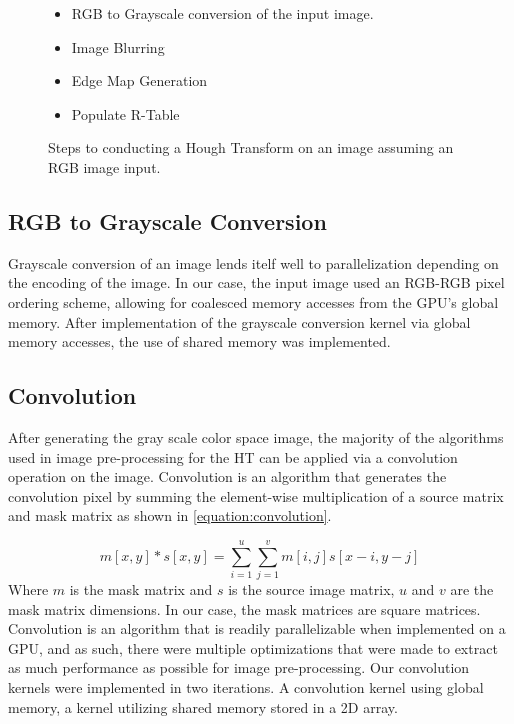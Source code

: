 \documentclass[conference]{IEEEtran}
\begin{document}
\begin{figure}[h]
  \begin{itemize}
    \item RGB to Grayscale conversion of the input image.
    \item Image Blurring 
    \item Edge Map Generation
    \item Populate R-Table
  \end{itemize}\caption{Steps to conducting a Hough Transform on an image assuming an RGB image input.}\label{figure:hough-transform-steps}
\end{figure}



\subsection{RGB to Grayscale Conversion}
Grayscale conversion of an image lends itelf well to parallelization depending on the encoding of the image.
In our case, the input image used an RGB-RGB pixel ordering scheme, allowing for coalesced memory accesses from the GPU's global memory.
After implementation of the grayscale conversion kernel via global memory accesses, the use of shared memory was implemented.



\subsection{Convolution}
After generating the gray scale color space image, the majority of the algorithms used in image pre-processing for the HT can be applied via a convolution operation on the image.
Convolution is an algorithm that generates the convolution pixel by summing the element-wise multiplication of a source matrix and mask matrix as shown in \autoref{equation:convolution}.

\begin{equation}
  m[x,y] * s[x,y] = \sum\limits_{i = 1}^{u} \sum\limits_{j = 1}^{v} m[i,j]s[x-i, y-j]
  \label{equation:convolution}
\end{equation}
Where $m$ is the mask matrix and $s$ is the source image matrix, $u$ and $v$ are the mask matrix dimensions. In our case, the mask matrices are square matrices.
Convolution is an algorithm that is readily parallelizable when implemented on a GPU, and as such, there were multiple optimizations that were made to extract as much performance as possible for image pre-processing.
Our convolution kernels were implemented in two iterations. 
A convolution kernel using global memory, a kernel utilizing shared memory stored in a 2D array.
\end{document}
